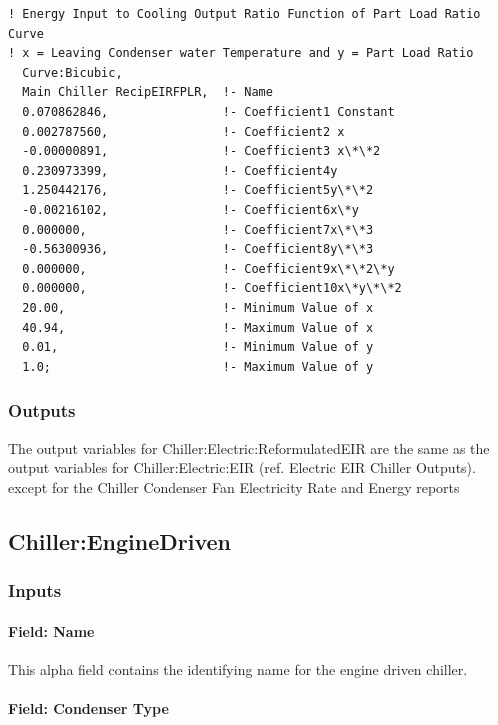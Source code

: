\begin{lstlisting}
! Energy Input to Cooling Output Ratio Function of Part Load Ratio Curve
! x = Leaving Condenser water Temperature and y = Part Load Ratio
  Curve:Bicubic,
  Main Chiller RecipEIRFPLR,  !- Name
  0.070862846,                !- Coefficient1 Constant
  0.002787560,                !- Coefficient2 x
  -0.00000891,                !- Coefficient3 x\*\*2
  0.230973399,                !- Coefficient4y
  1.250442176,                !- Coefficient5y\*\*2
  -0.00216102,                !- Coefficient6x\*y
  0.000000,                   !- Coefficient7x\*\*3
  -0.56300936,                !- Coefficient8y\*\*3
  0.000000,                   !- Coefficient9x\*\*2\*y
  0.000000,                   !- Coefficient10x\*y\*\*2
  20.00,                      !- Minimum Value of x
  40.94,                      !- Maximum Value of x
  0.01,                       !- Minimum Value of y
  1.0;                        !- Maximum Value of y
\end{lstlisting}

\subsubsection{Outputs}\label{outputs-5-006}

The output variables for Chiller:Electric:ReformulatedEIR are the same as the output variables for Chiller:Electric:EIR (ref. Electric EIR Chiller Outputs). except for the Chiller Condenser Fan Electricity Rate and Energy reports

\subsection{Chiller:EngineDriven}\label{chillerenginedriven}

\subsubsection{Inputs}\label{inputs-6-018}

\paragraph{Field: Name}\label{field-name-5-017}

This alpha field contains the identifying name for the engine driven chiller.

\paragraph{Field: Condenser Type}\label{field-condenser-type-3-000}

